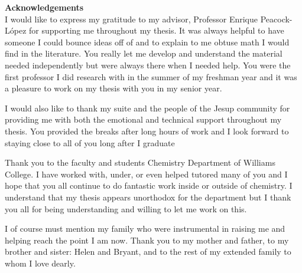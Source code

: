 \setcounter{page}{1}
\thispagestyle{plain}
\begin{center}
	\vspace*{\fill}
	\textbf{Acknowledgements}\\
	I would like to express my gratitude to my advisor, Professor Enrique Peacock-L\'opez for supporting me throughout my thesis. It was always helpful to have someone I could bounce ideas off of and to explain to me obtuse math I would find in the literature. You really let me develop and understand the material needed independently but were always there when I needed help. You were the first professor I did research with in the summer of my freshman year and it was a pleasure to work on my thesis with you in my senior year.
	
	I would also like to thank my suite and the people of the Jesup community for providing me with both the emotional and technical support throughout my thesis. You provided the breaks after long hours of work and I look forward to staying close to all of you long after I graduate

	Thank you to the faculty and students Chemistry Department of Williams College. I have worked with, under, or even helped tutored many of you and I hope that you all continue to do fantastic work inside or outside of chemistry. I understand that my thesis appears unorthodox for the department but I thank you all for being understanding and willing to let me work on this. 

	I of course must mention my family who were instrumental in raising me and helping reach the point I am now. Thank you to my mother and father, to my brother and sister: Helen and Bryant, and to the rest of my extended family to whom I love dearly.
	\vspace*{\fill}
\end{center}
\pagebreak